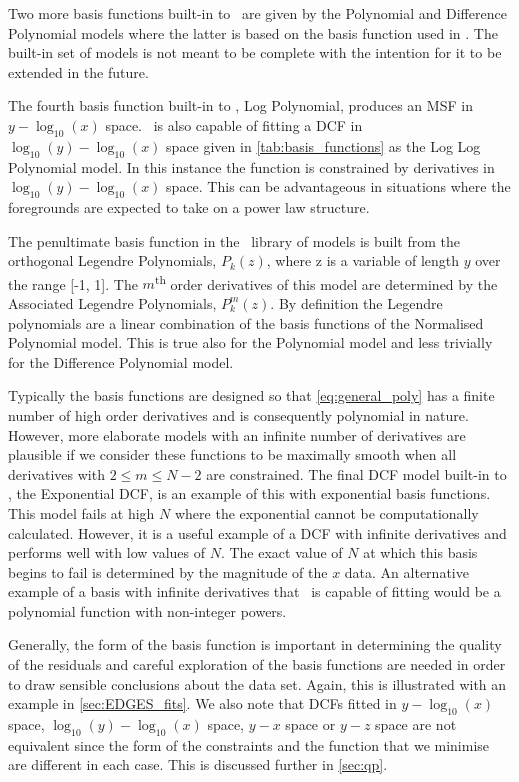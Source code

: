 Two more basis functions built-in to \maxsmooth~are given by the Polynomial and Difference Polynomial models where the latter is based on the basis function used in \cite{Sathyanarayana_msf_2017}. The built-in set of models is not meant to be complete with the intention for it to be extended in the future.

The fourth basis function built-in to \maxsmooth, Log Polynomial, produces an MSF in $y - \log_{10}(x)$ space. \maxsmooth~is also capable of fitting a DCF in $\log_{10}(y) - \log_{10}(x)$ space given in \cref{tab:basis_functions} as the Log Log Polynomial model. In this instance the function is constrained by derivatives in $\log_{10}(y) - \log_{10}(x)$ space. This can be advantageous in situations where the foregrounds are expected to take on a power law structure.

The penultimate basis function in the \maxsmooth~library of models is built from the orthogonal Legendre Polynomials, $P_k(z)$, where z is a variable of length $y$ over the range [-1, 1]. The $m$\textsuperscript{th} order derivatives of this model are determined by the Associated Legendre Polynomials, $P^m_k(z)$. By definition the Legendre polynomials are a linear combination of the basis functions of the Normalised Polynomial model. This is true also for the Polynomial model and less trivially for the Difference Polynomial model.

Typically the basis functions are designed so that \cref{eq:general_poly} has a finite number of high order derivatives and is consequently polynomial in nature. However, more elaborate models with an infinite number of derivatives are plausible if we consider these functions to be maximally smooth when all derivatives with $ 2\leq m \leq N-2$ are constrained. The final DCF model built-in to \maxsmooth, the Exponential DCF, is an example of this with exponential basis functions. This model fails at high $N$ where the exponential cannot be computationally calculated. However, it is a useful example of a DCF with infinite derivatives and performs well with low values of $N$. The exact value of $N$ at which this basis begins to fail is determined by the magnitude of the $x$ data. An alternative example of a basis with infinite derivatives that \maxsmooth~is capable of fitting would be a polynomial function with non-integer powers.

Generally, the form of the basis function is important in determining the quality of the residuals and careful exploration of the basis functions are needed in order to draw sensible conclusions about the data set. Again, this is illustrated with an example in \cref{sec:EDGES_fits}. We also note that DCFs fitted in $y - \log_{10}(x)$ space, $\log_{10}(y) - \log_{10}(x)$ space, $y - x$ space or $y - z$ space are not equivalent since the form of the constraints and the function that we minimise are different in each case. This is discussed further in \cref{sec:qp}.

